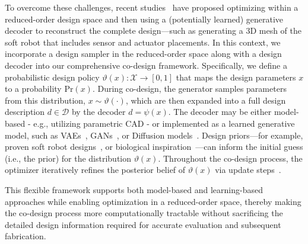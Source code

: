 To overcome these challenges, recent studies~\citep{song2024morphvae, wang2024diffusebot, navez2024contributions} have proposed optimizing within a reduced-order design space and then using a (potentially learned) generative decoder to reconstruct the complete design—such as generating a 3D mesh of the soft robot that includes sensor and actuator placements. In this context, we incorporate a design sampler in the reduced-order space along with a design decoder into our comprehensive co-design framework. Specifically, we define a probabilistic design policy $\vartheta(x): \mathcal{X} \to [0,1]$ that maps the design parameters $x$ to a probability $\mathrm{Pr}(x)$. During co-design, the generator samples parameters from this distribution, $x \sim \vartheta(\cdot)$, which are then expanded into a full design description $d \in \mathcal{D}$ by the decoder $d = \psi(x)$. The decoder may be either model-based - e.g., utilizing parametric \gls{CAD} - or implemented as a learned generative model, such as \glspl{VAE}~\citep{song2024morphvae, navez2024contributions}, \glspl{GAN}~\citep{hu2022modular}, or Diffusion models~\citep{wang2024diffusebot}. 
Design priors—for example, proven soft robot designs~\citep{navez2024contributions}, or biological inspiration~\citep{mazzolai2020vision, chen2020design, laschi2024bioinspiration}—can inform the initial guess (i.e., the prior) for the distribution $\vartheta(x)$. Throughout the co-design process, the optimizer iteratively refines the posterior belief of $\vartheta(x)$ via update steps~\citep{song2024morphvae, sutton1998reinforcement}.

This flexible framework supports both model-based and learning-based approaches while enabling optimization in a reduced-order space, thereby making the co-design process more computationally tractable without sacrificing the detailed design information required for accurate evaluation and subsequent fabrication.

